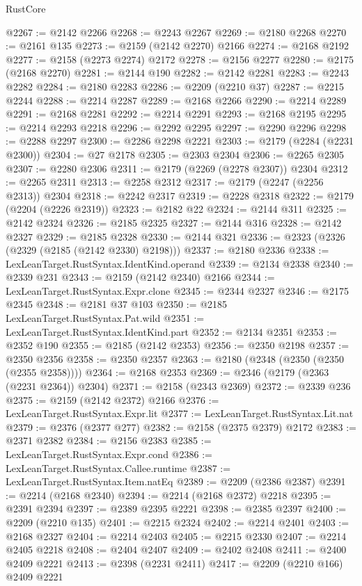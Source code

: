 \begin{lexlean}{RustCore}
\begin{coremodule}
@2267 := @2142 @2266
@2268 := @2243 @2267
@2269 := @2180 @2268
@2270 := @2161 @135
@2273 := @2159 (@2142 @2270) @2166
@2274 := @2168 @2192
@2277 := @2158 (@2273 @2274) @2172
@2278 := @2156 @2277
@2280 := @2175 (@2168 @2270)
@2281 := @2144 @190
@2282 := @2142 @2281
@2283 := @2243 @2282
@2284 := @2180 @2283
@2286 := @2209 (@2210 @37)
@2287 := @2215 @2244
@2288 := @2214 @2287
@2289 := @2168 @2266
@2290 := @2214 @2289
@2291 := @2168 @2281
@2292 := @2214 @2291
@2293 := @2168 @2195
@2295 := @2214 @2293 @2218
@2296 := @2292 @2295
@2297 := @2290 @2296
@2298 := @2288 @2297
@2300 := @2286 @2298 @2221
@2303 := @2179 (@2284 (@2231 @2300))
@2304 := @27 @2178
@2305 := @2303 @2304
@2306 := @2265 @2305
@2307 := @2280 @2306
@2311 := @2179 (@2269 (@2278 @2307)) @2304
@2312 := @2265 @2311
@2313 := @2258 @2312
@2317 := @2179 (@2247 (@2256 @2313)) @2304
@2318 := @2242 @2317
@2319 := @2228 @2318
@2322 := @2179 (@2204 (@2226 @2319))
@2323 := @2182 @22
@2324 := @2144 @311
@2325 := @2142 @2324
@2326 := @2185 @2325
@2327 := @2144 @316
@2328 := @2142 @2327
@2329 := @2185 @2328
@2330 := @2144 @321
@2336 := @2323 (@2326 (@2329 (@2185 (@2142 @2330) @2198)))
@2337 := @2180 @2336
@2338 := LexLeanTarget.RustSyntax.IdentKind.operand
@2339 := @2134 @2338
@2340 := @2339 @231
@2343 := @2159 (@2142 @2340) @2166
@2344 := LexLeanTarget.RustSyntax.Expr.clone
@2345 := @2344 @2327
@2346 := @2175 @2345
@2348 := @2181 @37 @103
@2350 := @2185 LexLeanTarget.RustSyntax.Pat.wild
@2351 := LexLeanTarget.RustSyntax.IdentKind.part
@2352 := @2134 @2351
@2353 := @2352 @190
@2355 := @2185 (@2142 @2353)
@2356 := @2350 @2198
@2357 := @2350 @2356
@2358 := @2350 @2357
@2363 := @2180 (@2348 (@2350 (@2350 (@2355 @2358))))
@2364 := @2168 @2353
@2369 := @2346 (@2179 (@2363 (@2231 @2364)) @2304)
@2371 := @2158 (@2343 @2369)
@2372 := @2339 @236
@2375 := @2159 (@2142 @2372) @2166
@2376 := LexLeanTarget.RustSyntax.Expr.lit
@2377 := LexLeanTarget.RustSyntax.Lit.nat
@2379 := @2376 (@2377 @277)
@2382 := @2158 (@2375 @2379) @2172
@2383 := @2371 @2382
@2384 := @2156 @2383
@2385 := LexLeanTarget.RustSyntax.Expr.cond
@2386 := LexLeanTarget.RustSyntax.Callee.runtime
@2387 := LexLeanTarget.RustSyntax.Item.natEq
@2389 := @2209 (@2386 @2387)
@2391 := @2214 (@2168 @2340)
@2394 := @2214 (@2168 @2372) @2218
@2395 := @2391 @2394
@2397 := @2389 @2395 @2221
@2398 := @2385 @2397
@2400 := @2209 (@2210 @135)
@2401 := @2215 @2324
@2402 := @2214 @2401
@2403 := @2168 @2327
@2404 := @2214 @2403
@2405 := @2215 @2330
@2407 := @2214 @2405 @2218
@2408 := @2404 @2407
@2409 := @2402 @2408
@2411 := @2400 @2409 @2221
@2413 := @2398 (@2231 @2411)
@2417 := @2209 (@2210 @166) @2409 @2221

\end{coremodule}
\end{lexlean}
